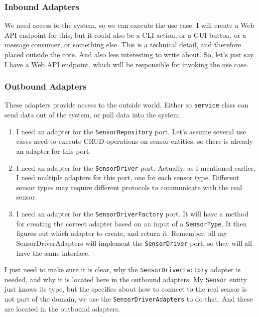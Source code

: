\subsubsection{Inbound Adapters}

We need access to the system, so we can execute the use case. I will create a Web API endpoint for this, but it could also be a CLI action, or a GUI button, or a message consumer, or something else. This is a technical detail, and therefore placed outside the core. And also less interesting to write about. So, let's just say I have a Web API endpoint, which will be responsible for invoking the use case.

\subsubsection{Outbound Adapters}

These adapters provide access to the outside world. Either so \texttt{service} class can send data out of the system, or pull data into the system.

\begin{enumerate}
    \item I need an adapter for the \texttt{SensorRepository} port. Let's assume several use cases need to execute CRUD operations on sensor entities, so there is already an adapter for this port.
    \item I need an adapter for the \texttt{SensorDriver} port. Actually, as I mentioned earlier, I need multiple adapters for this port, one for each sensor type. Different sensor types may require different protocols to communicate with the real sensor.
    \item I need an adapter for the \texttt{SensorDriverFactory} port. It will have a method for creating the correct adapter based on an input of a \texttt{SensorType}. It then figures out which adapter to create, and return it. Remember, all my SensorDriverAdapters will implement the \texttt{SensorDriver} port, so they will all have the same interface.
\end{enumerate}

I just need to make sure it is clear, why the \texttt{SensorDriverFactory} adapter is needed, and why it is located here in the outbound adapters. My \texttt{Sensor} entity just knows its type, but the specifics about how to connect to the real sensor is not part of the domain, we use the \texttt{SensorDriverAdapters} to do that. And these are located in the outbound adapters. 

